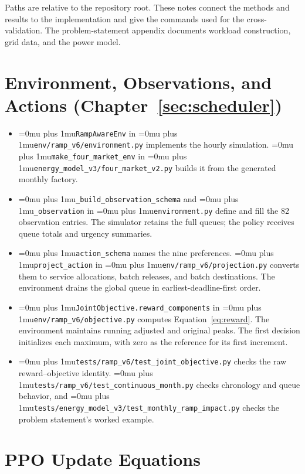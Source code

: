 \documentclass{UNCC-thesis}
\newcommand{\codepath}[1]{{\Urlmuskip=0mu plus 1mu\relax\nolinkurl{#1}}}
\begin{document}
Paths are relative to the repository root. These notes connect the methods
and results to the implementation and give the commands used for the cross-validation.
The problem-statement appendix documents workload construction, grid data,
and the power model.

\section{Environment, Observations, and Actions
  (Chapter~\ref{sec:scheduler})}
\begin{itemize}
  \item \codepath{RampAwareEnv} in \codepath{env/ramp_v6/environment.py}
        implements the hourly simulation. \codepath{make_four_market_env}
        in \codepath{energy_model_v3/four_market_v2.py} builds it from the
        generated monthly factory.
  \item \codepath{_build_observation_schema} and \codepath{_observation}
        in \codepath{environment.py} define and fill the 82 observation
        entries. The simulator retains the full queues; the policy receives
        queue totals and urgency summaries.
  \item \codepath{action_schema} names the nine preferences.
        \codepath{project_action} in \codepath{env/ramp_v6/projection.py}
        converts them to service allocations, batch releases, and batch
        destinations. The environment drains the global queue in
        earliest-deadline-first order.
  \item \codepath{JointObjective.reward_components} in
        \codepath{env/ramp_v6/objective.py} computes
        Equation~\eqref{eq:reward}. The environment maintains running
        adjusted and original peaks. The first decision initializes each
        maximum, with zero as the reference for its first increment.
  \item \codepath{tests/ramp_v6/test_joint_objective.py} checks the raw
        reward--objective identity. \codepath{tests/ramp_v6/test_continuous_month.py}
        checks chronology and queue behavior, and
        \codepath{tests/energy_model_v3/test_monthly_ramp_impact.py} checks
        the problem statement's worked example.
\end{itemize}

\section{PPO Update Equations}
\label{subsec:ppo-details}
\end{document}
